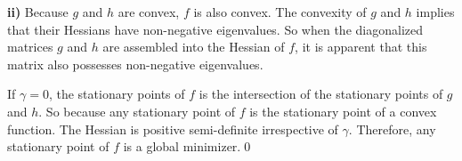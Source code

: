{\bf ii)}\hskip2mm
Because $g$ and $h$ are convex, $f$ is also convex.
The convexity of $g$ and $h$ implies that their Hessians have non-negative eigenvalues.
So when the diagonalized matrices $g$ and $h$ are assembled into the Hessian of $f$, it is apparent that this matrix also possesses non-negative eigenvalues.

If $\gamma=0$, the stationary points of $f$ is the intersection of the stationary points of $g$ and $h$.
So because any stationary point of $f$ is the stationary point of a convex function.
The Hessian is positive semi-definite irrespective of $\gamma$.
Therefore, any stationary point of $f$ is a global minimizer.\hfill\qed\kern3pt
\bye
